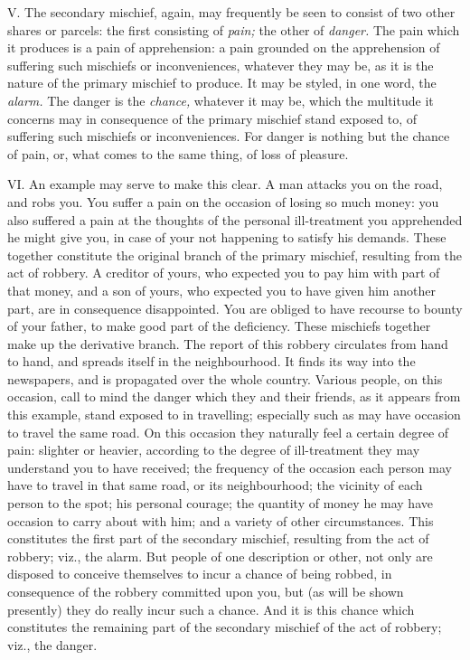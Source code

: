 \documentclass[12pt]{report}
\begin{document}
V. The secondary mischief, again, may frequently be seen to consist of
two other shares or parcels: the first consisting of \emph{pain;} the
other of \emph{danger.} The pain which it produces is a pain of
apprehension: a pain grounded on the apprehension of suffering such
mischiefs or inconveniences, whatever they may be, as it is the nature
of the primary mischief to produce. It may be styled, in one word, the
\emph{alarm.} The danger is the \emph{chance,} whatever it may be, which
the multitude it concerns may in consequence of the primary mischief
stand exposed to, of suffering such mischiefs or inconveniences. For
danger is nothing but the chance of pain, or, what comes to the same
thing, of loss of pleasure.

VI. An example may serve to make this clear. A man attacks you on the
road, and robs you. You suffer a pain on the occasion of losing so much
money: you also suffered a pain at the thoughts of the personal
ill-treatment you apprehended he might give you, in case of your not
happening to satisfy his demands. These together constitute the original
branch of the primary mischief, resulting from the act of robbery. A
creditor of yours, who expected you to pay him with part of that money,
and a son of yours, who expected you to have given him another part, are
in consequence disappointed. You are obliged to have recourse to bounty
of your father, to make good part of the deficiency. These mischiefs
together make up the derivative branch. The report of this robbery
circulates from hand to hand, and spreads itself in the neighbourhood.
It finds its way into the newspapers, and is propagated over the whole
country. Various people, on this occasion, call to mind the danger which
they and their friends, as it appears from this example, stand exposed
to in travelling; especially such as may have occasion to travel the
same road. On this occasion they naturally feel a certain degree of
pain: slighter or heavier, according to the degree of ill-treatment they
may understand you to have received; the frequency of the occasion each
person may have to travel in that same road, or its neighbourhood; the
vicinity of each person to the spot; his personal courage; the quantity
of money he may have occasion to carry about with him; and a variety of
other circumstances. This constitutes the first part of the secondary
mischief, resulting from the act of robbery; viz., the alarm. But people
of one description or other, not only are disposed to conceive
themselves to incur a chance of being robbed, in consequence of the
robbery committed upon you, but (as will be shown presently) they do
really incur such a chance. And it is this chance which constitutes the
remaining part of the secondary mischief of the act of robbery; viz.,
the danger.
\end{document}

